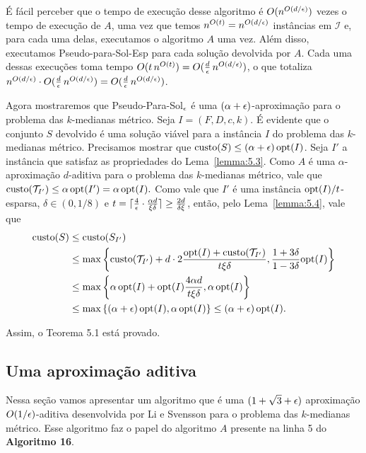 É fácil perceber que o tempo de execução desse algoritmo é $O(n^{O(d/\epsilon)})$ vezes o tempo de execução de $A$, uma vez que temos $n^{O(t)} = n^{O(d/\epsilon)}$ instâncias em $\mathcal{I}$ e, para cada uma delas, executamos o algoritmo $A$ uma vez. Além disso, executamos {\sc Pseudo-para-Sol-Esp} para cada solução devolvida por $A$. Cada uma dessas execuções toma tempo $O(t\,n^{O(t)}) = O(\frac{d}{\epsilon} \, n^{O(d/\epsilon)})$, o que totaliza $n^{O(d/\epsilon)} \cdot O(\frac{d}{\epsilon} \, n^{O(d/\epsilon)}) = O(\frac{d}{\epsilon} \, n^{O(d/\epsilon)})$.

Agora mostraremos que {\sc Pseudo-Para-Sol}$_\epsilon$ é uma $(\alpha + \epsilon)$-aproximação para o problema das $k$-medianas métrico. Seja $I = (F,D,c,k)$. É evidente que o conjunto $S$ devolvido é uma solução viável para a instância $I$ do problema das $k$-medianas métrico. Precisamos mostrar que ${\text{custo}(S) \leq (\alpha + \epsilon)\, \mathrm{opt}(I)}$. Seja $I'$ a instância que satisfaz as propriedades do Lema~\ref{lemma:5.3}. Como $A$ é uma $\alpha$-aproximação $d$-aditiva para o problema das $k$-medianas métrico, vale que
\(
    \text{custo}(\mathcal{T}_{I'}) \leq \alpha \, \mathrm{opt}(I') = \alpha \, \mathrm{opt}(I). \nonumber
\) 
Como vale que $I'$ é uma instância $\mathrm{opt}(I)/t$-esparsa, $\delta \in (0,1/8)$ e $t = \lceil\frac{4}{\epsilon} \cdot \frac{\alpha d}{\xi \delta}\rceil \geq \frac{2d}{\delta \xi}$, então, pelo Lema~\ref{lemma:5.4}, vale que 
\begin{align}
    \text{custo}(S) &\leq \text{custo}(S_{I'}) \nonumber\\
    &\leq \max \left\{ \text{custo}(\mathcal{T}_{I'}) + d \cdot 2 \frac{\mathrm{opt}(I) + \text{custo}(\mathcal{T}_{I'})}{t\xi\delta}, \frac{1+3\delta}{1-3\delta}\mathrm{opt}(I) \right\} \nonumber \\
    &\leq  \max \left\{ \alpha\, \mathrm{opt}(I) + \mathrm{opt}(I) \frac{4 \alpha d}{t\xi\delta}, \alpha \, \mathrm{opt}(I) \right\} \nonumber \\
    &\leq  \max \left\{ (\alpha + \epsilon)\, \mathrm{opt}(I), \alpha \, \mathrm{opt}(I) \right\} \leq (\alpha + \epsilon) \, \mathrm{opt}(I). \nonumber
\end{align}

Assim, o Teorema 5.1 está provado.

\subsection{Uma aproximação aditiva}

Nessa seção vamos apresentar um algoritmo que é uma $(1 + \sqrt{3} + \epsilon)$ aproximação $O(1/\epsilon)$-aditiva desenvolvida por Li e Svensson para o problema das $k$-medianas métrico. Esse algoritmo faz o papel do algoritmo $A$ presente na linha 5 do {\bf Algoritmo 16}.

